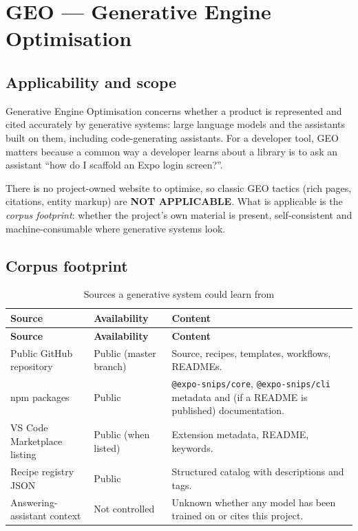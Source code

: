 \chapter{GEO --- Generative Engine Optimisation}
\label{ch:geo}

\section{Applicability and scope}

Generative Engine Optimisation concerns whether a product is represented and
cited accurately by generative systems: large language models and the assistants
built on them, including code-generating assistants. For a developer tool, GEO
matters because a common way a developer learns about a library is to ask an
assistant ``how do I scaffold an Expo login screen?''.

There is no project-owned website to optimise, so classic GEO tactics
(rich pages, citations, entity markup) are \textbf{NOT APPLICABLE}. What is
applicable is the \emph{corpus footprint}: whether the project's own material is
present, self-consistent and machine-consumable where generative systems look.

\section{Corpus footprint}

\begin{longtable}{@{}L{4.4cm}L{2.8cm}L{7cm}@{}}
\caption{Sources a generative system could learn from}\\
\toprule
\textbf{Source} & \textbf{Availability} & \textbf{Content} \\
\midrule
\endfirsthead
\toprule
\textbf{Source} & \textbf{Availability} & \textbf{Content} \\
\midrule
\endhead
Public GitHub repository & Public (master branch) & Source, recipes, templates,
workflows, READMEs. \\
npm packages & Public & \texttt{@expo-snips/core}, \texttt{@expo-snips/cli}
metadata and (if a README is published) documentation. \\
VS Code Marketplace listing & Public (when listed) & Extension metadata, README,
keywords. \\
Recipe registry JSON & Public & Structured catalog with descriptions and tags. \\
Answering-assistant context & Not controlled & Unknown whether any model has been
trained on or cites this project. \\
\bottomrule
\end{longtable}

